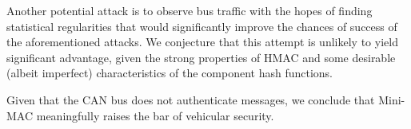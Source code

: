 Another potential attack is to observe bus traffic with the hopes of finding statistical
regularities that would significantly improve the chances of success of the aforementioned attacks.
We conjecture that this attempt is unlikely to yield significant advantage, given the
strong properties of HMAC and some
desirable (albeit imperfect) characteristics of the component hash functions.

Given that the CAN bus does not authenticate messages, we conclude that Mini-MAC
meaningfully raises the bar of vehicular security.


	
